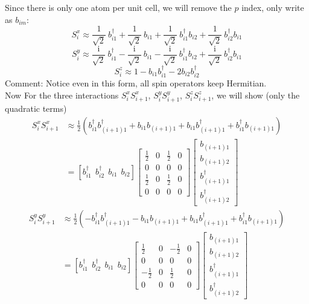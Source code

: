 \documentclass[letterpaper,10pt]{article}
\newcommand{\ii}{\mathrm{i}}
\begin{document}
Since there is only one atom per unit cell, we will remove the $p$ index, only write as $b_{im}$:
$$
S_{i}^{x}\approx\frac{1}{\sqrt{2}}\ b_{i1}^{\dagger}+\frac{1}{\sqrt{2}}\ b_{i1}+\frac{1}{\sqrt{2}}\  b_{i1}^{\dagger}b_{i2}+\frac{1}{\sqrt{2}}\  b_{i2}^{\dagger}b_{i1}$$$$
S_{i}^{y}\approx\frac{\ii}{\sqrt{2}}\ b_{i1}^{\dagger}-\frac{\ii}{\sqrt{2}}\ b_{i1}-\frac{\ii}{\sqrt{2}}\ b_{i1}^{\dagger}b_{i2}+\frac{\ii}{\sqrt{2}}\ b_{i2}^{\dagger}b_{i1}$$$$
S_{i}^{z}\approx1-b_{i1}b_{i1}^{\dagger}-2b_{i2}b_{i2}^{\dagger}$$
\indent Comment: Notice even in this form, all spin operators keep Hermitian.\\
\indent Now For the three interactions $S_{i}^x S_{i+1}^x$, $S_{i}^y S_{i+1}^y$, $S_{i}^z S_{i+1}^z$, we will show (only the quadratic terms)
$$
\begin{aligned}
    S_{i}^x S_{i+1}^x &\approx\frac{1}{2}\left(b_{i1}^{\dagger}b_{(i+1)1}^{\dagger}+b_{i1}b_{(i+1)1}+b_{i1}b_{(i+1)1}^{\dagger}+b_{i1}^{\dagger}b_{(i+1)1}\right)\\ &=\left[
        b_{i1}^{\dagger} \ \ 
        b_{i2}^{\dagger}\  \ 
        b_{i1}\ \ 
        b_{i2}\right]
       \begin{bmatrix}
            \frac{1}{2} & 0 & \frac{1}{2} & 0 \\
           0 &  0 & 0 &0 \\
           \frac{1}{2} &  0 & \frac{1}{2} &0\\
            0 & 0 & 0& 0
            \end{bmatrix}\begin{bmatrix}
                b_{(i+1)1}  \\
                b_{(i+1)2}  \\
                b_{(i+1)1}^{\dagger}\\
                b_{(i+1)2}^{\dagger}
                \end{bmatrix}
\end{aligned}
$$
$$
\begin{aligned}
    S_{i}^y S_{i+1}^y &\approx\frac{1}{2}\left(-b_{i1}^{\dagger}b_{(i+1)1}^{\dagger}-b_{i1}b_{(i+1)1}+b_{i1}b_{(i+1)1}^{\dagger}+b_{i1}^{\dagger}b_{(i+1)1}\right)\\ &=\left[
        b_{i1}^{\dagger} \ \ 
        b_{i2}^{\dagger}\  \ 
        b_{i1}\ \ 
        b_{i2}\right]
        \begin{bmatrix}
            \frac{1}{2} & 0 & -\frac{1}{2} & 0 \\
           0 &  0 & 0 &0 \\
           -\frac{1}{2} &  0 & \frac{1}{2} &0\\
            0 & 0 & 0& 0
            \end{bmatrix}\begin{bmatrix}
                b_{(i+1)1}  \\
                b_{(i+1)2}  \\
                b_{(i+1)1}^{\dagger}\\
                b_{(i+1)2}^{\dagger}
                \end{bmatrix}
\end{aligned}
$$
\end{document}
